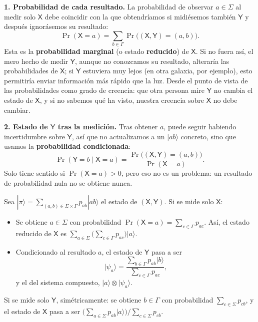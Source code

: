 \documentclass[11pt, a4paper, twoside, openright]{report}
\begin{document}
\noindent \textbf{1. Probabilidad de cada resultado.} La probabilidad de observar $a \in \Sigma$ al medir solo $\mathsf{X}$ debe coincidir con la que obtendríamos si midiésemos también $\mathsf{Y}$ y después ignorásemos su resultado:
\[ \Pr(\mathsf{X} = a) = \sum_{b\in\Gamma} \Pr\big((\mathsf{X},\mathsf{Y}) = (a,b)\big). \]
Esta es la \textbf{probabilidad marginal} (o estado \textbf{reducido}) de $\mathsf{X}$. Si no fuera así, el mero hecho de medir $\mathsf{Y}$, aunque no conozcamos su resultado, alteraría las probabilidades de $\mathsf{X}$; si $\mathsf{Y}$ estuviera muy lejos (en otra galaxia, por ejemplo), esto permitiría enviar información más rápido que la luz. Desde el punto de vista de las probabilidades como grado de creencia: que otra persona mire $\mathsf{Y}$ no cambia el estado de $\mathsf{X}$, y si no sabemos qué ha visto, nuestra creencia sobre $\mathsf{X}$ no debe cambiar.

\noindent \textbf{2. Estado de $\mathsf{Y}$ tras la medición.} Tras obtener $a$, puede seguir habiendo incertidumbre sobre $\mathsf{Y}$, así que no actualizamos a un $|ab\rangle$ concreto, sino que usamos la \textbf{probabilidad condicionada}:
\[ \Pr(\mathsf{Y} = b \mid \mathsf{X} = a) = \frac{\Pr\big((\mathsf{X},\mathsf{Y}) = (a,b)\big)}{\Pr(\mathsf{X}=a)}. \]
Solo tiene sentido si $\Pr(\mathsf{X}=a) > 0$, pero eso no es un problema: un resultado de probabilidad nula no se obtiene nunca.

\begin{tcolorbox}[colback=teal!5!white,colframe=teal!75!black,title=\textbf{Regla de la medición parcial (caso probabilístico)}]
Sea $|\pi\rangle = \sum_{(a,b)\in\Sigma\times\Gamma} p_{ab}|ab\rangle$ el estado de $(\mathsf{X},\mathsf{Y})$. Si se mide solo $\mathsf{X}$:
\begin{itemize}
    \item Se obtiene $a \in \Sigma$ con probabilidad $\displaystyle\Pr(\mathsf{X}=a) = \sum_{c\in\Gamma} p_{ac}$. Así, el estado reducido de $\mathsf{X}$ es $\displaystyle\sum_{a\in\Sigma}\Big(\sum_{c\in\Gamma} p_{ac}\Big)|a\rangle$.
    \item Condicionado al resultado $a$, el estado de $\mathsf{Y}$ pasa a ser
    \[ |\psi_a\rangle = \frac{\sum_{b\in\Gamma} p_{ab}|b\rangle}{\sum_{c\in\Gamma} p_{ac}}, \]
    y el del sistema compuesto, $|a\rangle\otimes|\psi_a\rangle$.
\end{itemize}
Si se mide solo $\mathsf{Y}$, simétricamente: se obtiene $b\in\Gamma$ con probabilidad $\sum_{c\in\Sigma}p_{cb}$, y el estado de $\mathsf{X}$ pasa a ser $\big(\sum_{a\in\Sigma}p_{ab}|a\rangle\big)\big/\sum_{c\in\Sigma}p_{cb}$.
\end{tcolorbox}
\end{document}
